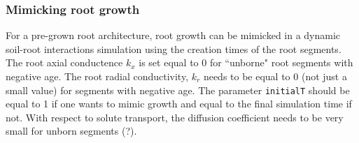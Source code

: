 \subsubsection*{Mimicking root growth}

For a pre-grown root architecture, root growth can be mimicked in a dynamic soil-root interactions simulation using the creation times of the root segments. The root axial conductence $k_x$ is set equal to 0 for ``unborne" root segments with negative age. The root radial conductivity, $k_r$ needs to be equal to 0 (not just a small value) for segments with negative  age. 
The parameter \lstinline{initialT} should be equal to 1 if one wants to mimic growth and equal to the final simulation time if not. 
With respect to solute transport, the diffusion coefficient needs to be very small  for unborn segments (?).
